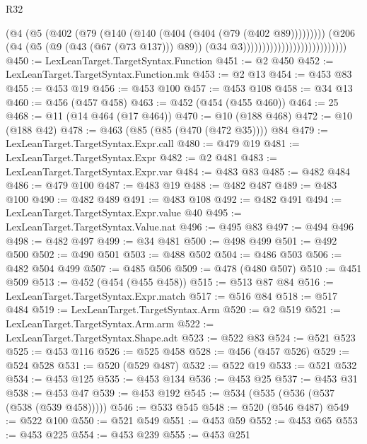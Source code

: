 \begin{lexlean}{R32}
\begin{coremodule}
                                                  (@4
                                                    (@5
                                                      (@402
                                                        (@79
                                                          (@140
                                                            (@140
                                                              (@404 (@404 (@79 (@402 @89)))))))))
                                                    (@206
                                                      (@4
                                                        (@5 (@9 (@43 (@67 (@73 @137))) @89))
                                                        (@34 @3)))))))))))))))))))))))))))
@450 := LexLeanTarget.TargetSyntax.Function
@451 := @2 @450
@452 := LexLeanTarget.TargetSyntax.Function.mk
@453 := @2 @13
@454 := @453 @83
@455 := @453 @19
@456 := @453 @100
@457 := @453 @108
@458 := @34 @13
@460 := @456 (@457 @458)
@463 := @452 (@454 (@455 @460))
@464 := 25
@468 := @11 (@14 @464 (@17 @464))
@470 := @10 (@188 @468)
@472 := @10 (@188 @42)
@478 := @463 (@85 (@85 (@470 (@472 @35)))) @84
@479 := LexLeanTarget.TargetSyntax.Expr.call
@480 := @479 @19
@481 := LexLeanTarget.TargetSyntax.Expr
@482 := @2 @481
@483 := LexLeanTarget.TargetSyntax.Expr.var
@484 := @483 @83
@485 := @482 @484
@486 := @479 @100
@487 := @483 @19
@488 := @482 @487
@489 := @483 @100
@490 := @482 @489
@491 := @483 @108
@492 := @482 @491
@494 := LexLeanTarget.TargetSyntax.Expr.value @40
@495 := LexLeanTarget.TargetSyntax.Value.nat
@496 := @495 @83
@497 := @494 @496
@498 := @482 @497
@499 := @34 @481
@500 := @498 @499
@501 := @492 @500
@502 := @490 @501
@503 := @488 @502
@504 := @486 @503
@506 := @482 @504 @499
@507 := @485 @506
@509 := @478 (@480 @507)
@510 := @451 @509
@513 := @452 (@454 (@455 @458))
@515 := @513 @87 @84
@516 := LexLeanTarget.TargetSyntax.Expr.match
@517 := @516 @84
@518 := @517 @484
@519 := LexLeanTarget.TargetSyntax.Arm
@520 := @2 @519
@521 := LexLeanTarget.TargetSyntax.Arm.arm
@522 := LexLeanTarget.TargetSyntax.Shape.adt
@523 := @522 @83
@524 := @521 @523
@525 := @453 @116
@526 := @525 @458
@528 := @456 (@457 @526)
@529 := @524 @528
@531 := @520 (@529 @487)
@532 := @522 @19
@533 := @521 @532
@534 := @453 @125
@535 := @453 @134
@536 := @453 @25
@537 := @453 @31
@538 := @453 @47
@539 := @453 @192
@545 := @534 (@535 (@536 (@537 (@538 (@539 @458)))))
@546 := @533 @545
@548 := @520 (@546 @487)
@549 := @522 @100
@550 := @521 @549
@551 := @453 @59
@552 := @453 @65
@553 := @453 @225
@554 := @453 @239
@555 := @453 @251

\end{coremodule}
\end{lexlean}
